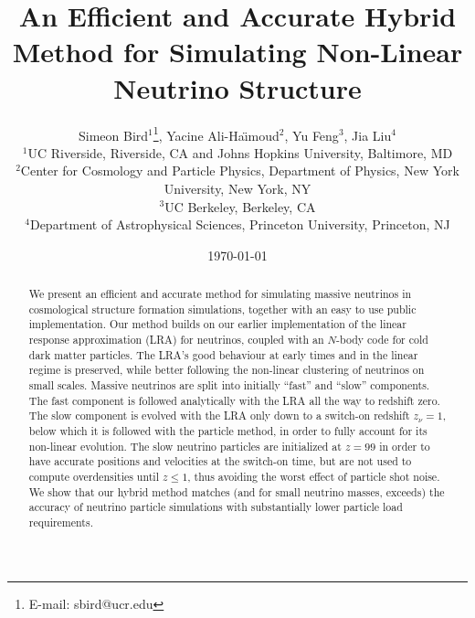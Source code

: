 \documentclass[useAMS, usenatbib]{mnras}
\begin{document}
\title{An Efficient and Accurate Hybrid Method for Simulating Non-Linear Neutrino Structure}
\author[ S. Bird et al.]{Simeon Bird$^1$\thanks{E-mail: sbird@ucr.edu}, Yacine Ali-Ha\"{\i}moud$^2$, Yu Feng$^3$, Jia Liu$^4$\vspace{1.5mm}\\
$^1$UC Riverside, Riverside, CA  and Johns Hopkins University, Baltimore, MD\\
$^2$Center for Cosmology and Particle Physics, Department of Physics,
New York University, New York, NY\\
$^3$UC Berkeley, Berkeley, CA\\
$^4$Department of Astrophysical Sciences, Princeton University, Princeton, NJ
}

\date{\today}

\pagerange{\pageref{firstpage}--\pageref{lastpage}} 
\label{firstpage}

\maketitle

\begin{abstract}
We present an efficient and accurate method for simulating massive neutrinos in cosmological structure formation simulations, together with an easy to use public implementation. Our method builds on our earlier implementation of the linear response approximation (LRA)
for neutrinos, coupled with an $N$-body code for cold dark matter particles. The LRA's good behaviour at early times and in the linear regime is preserved, while better following the non-linear clustering of neutrinos on small scales. Massive neutrinos are split into initially ``fast'' and ``slow'' components. The fast component is followed analytically with the LRA all the way to redshift zero. The slow component is evolved with the LRA only down to a switch-on redshift $z_\nu = 1$, below which it is followed with the particle method, in order to fully account for its non-linear evolution. The slow neutrino particles are initialized at $z = 99$ in order to have accurate positions and velocities at the switch-on time, but are not used to compute overdensities until $z \leq 1$, thus avoiding the worst effect of particle shot noise. We show that our hybrid method matches (and for small neutrino masses, exceeds) the accuracy of neutrino particle simulations with substantially lower particle load requirements.
\end{abstract}
\end{document}
